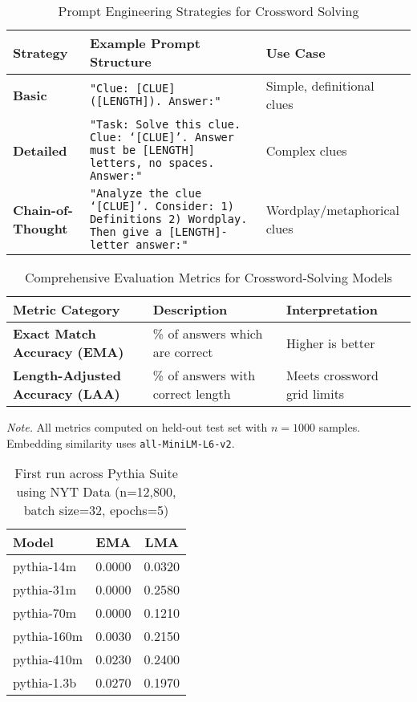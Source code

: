 \documentclass[
	a4paper, %
	10pt, %
	unnumberedsections, %
	twoside, %
]{LTJournalArticle}
\begin{document}
\begin{table*}[h] %
	\centering
	\caption{Prompt Engineering Strategies for Crossword Solving}
	\label{tab:prompt_strategies}
	\begin{tabular}{lp{8cm}l}	
		\hline
		\textbf{Strategy} & \textbf{Example Prompt Structure} & \textbf{Use Case} \\
		\hline
		\textbf{Basic} & \texttt{"Clue: [CLUE] ([LENGTH]). Answer:"} & Simple, definitional clues \\
		\hline
		\textbf{Detailed} & \texttt{"Task: Solve this clue. Clue: `[CLUE]'. Answer must be [LENGTH] letters, no spaces. Answer:"} & Complex clues \\
		\hline
		\textbf{Chain-of-Thought} & \texttt{"Analyze the clue `[CLUE]'. Consider: 1) Definitions 2) Wordplay. Then give a [LENGTH]-letter answer:"} & Wordplay/metaphorical clues \\
		\hline
	\end{tabular}
\end{table*}

\begin{table*}[h] %
	\centering
	\caption{Comprehensive Evaluation Metrics for Crossword-Solving Models}
	\label{tab:evaluation_metrics}
	\begin{tabular}{l l l}
		\toprule
		\textbf{Metric Category} & \textbf{Description} & \textbf{Interpretation} \\
		\midrule
		\textbf{Exact Match Accuracy (EMA)} & \% of answers which are correct & 
		Higher is better \\
		\textbf{Length-Adjusted Accuracy (LAA)} & 
		\% of answers with correct length & 
		Meets crossword grid limits \\
		\bottomrule
	\end{tabular}
	\footnotesize \textit{Note.} All metrics computed on held-out test set with $n=1000$ samples. Embedding similarity uses \texttt{all-MiniLM-L6-v2}.
\end{table*}

\begin{table*}[h] %
	\centering
	\caption{First run across Pythia Suite using NYT Data (n=12,800, batch size=32, epochs=5)}
	\begin{tabular}{l c c}
		\toprule
		Model & EMA & LMA \\
		\midrule
		pythia-14m & 0.0000 & 0.0320 \\
		pythia-31m & 0.0000 & 0.2580 \\
		pythia-70m & 0.0000 & 0.1210 \\
		pythia-160m & 0.0030 & 0.2150 \\
		pythia-410m & 0.0230 & 0.2400 \\
		pythia-1.3b & 0.0270 & 0.1970 \\
		\bottomrule
	\end{tabular}
	\label{tab:pythiarun1}
\end{table*}
\end{document}
